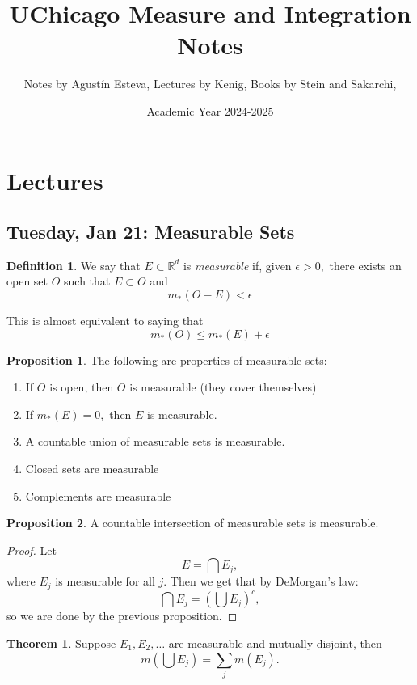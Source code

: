 \documentclass[10pt, oneside]{article}
\title{UChicago Measure and Integration Notes}
\author{Notes by Agustín Esteva, Lectures by Kenig, Books by Stein and Sakarchi, }
\date{Academic Year 2024-2025}
\newcommand{\bbR}{\mathbb{R}}
\theoremstyle{definition}
\newtheorem{thm}{Theorem}
\newtheorem{defn}{Definition}
\newtheorem{prop}{Proposition}
\begin{document}
\maketitle
\tableofcontents

\vspace{.25in}

\section{Lectures}

\subsection{Tuesday, Jan 21: Measurable Sets}
\begin{defn}
    We say that $E \subset \bbR^d$ is \textit{measurable} if, given $\epsilon>0,$ there exists an open set $O$ such that $E \subset O$ and 
    \[m_\ast(O - E)< \epsilon\]
\end{defn}
This is almost equivalent to saying that 
\[m_\ast(O) \leq m_\ast(E) + \epsilon\]
\begin{prop}
    The following are properties of measurable sets:
    \begin{enumerate}
        \item If $O$ is open, then $O$ is measurable (they cover themselves)
        \item If $m_\ast(E) = 0,$ then $E$ is measurable.
        \item A countable union of measurable sets is measurable.
        \item Closed sets are measurable
        \item Complements are measurable
    \end{enumerate}
\end{prop}
\begin{prop}
    A countable intersection of measurable sets is measurable.
\end{prop}
\begin{proof}
    Let 
    \[E = \bigcap E_j,\] where $E_j$ is measurable for all $j.$ Then we get that by DeMorgan's law:
    \[\bigcap E_j = \left(\bigcup E_j\right)^c,\] so we are done by the previous proposition.
\end{proof}
\begin{thm}
    Suppose $E_1, E_2, \dots$ are measurable and mutually disjoint, then 
    \[m\left(\bigcup E_j\right) = \sum_j m(E_j).\]
\end{thm}
\end{document}
